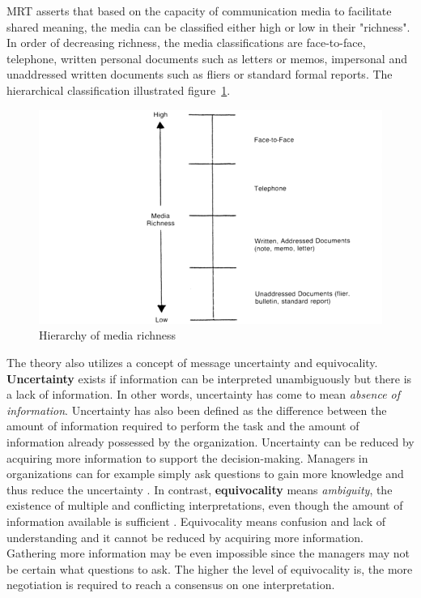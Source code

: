 \documentclass[english,12pt,a4paper,pdftex]{article}
\begin{document}
\ac{MRT} asserts that based on the capacity of communication media to facilitate shared meaning, the media can be classified either high or low in their "richness". In order of decreasing richness, the media classifications are face-to-face, telephone, written personal documents such as letters or memos, impersonal and unaddressed written documents such as fliers or standard formal reports. The hierarchical classification illustrated figure~\ref{fig:hierarchy_of_media_richness}.

\begin{figure}[htb]
\begin{center}
\includegraphics[width=1.0\textwidth]{hierarchy_of_media_richness.png}
\end{center}
\caption{Hierarchy of media richness \citep{daft1987}}
\label{fig:hierarchy_of_media_richness}
\end{figure}

The theory also utilizes a concept of message uncertainty and equivocality. \textbf{Uncertainty} exists if information can be interpreted unambiguously but there is a lack of information. In other words, uncertainty has come to mean \textit{absence of information}. Uncertainty has also been defined as the difference between the amount of information required to perform the task and the amount of information already possessed by the organization. Uncertainty can be reduced by acquiring more information to support the decision-making. Managers in organizations can for example simply ask questions to gain more knowledge and thus reduce the uncertainty \citep{daft1987}. In contrast, \textbf{equivocality} means \textit{ambiguity}, the existence of multiple and conflicting interpretations, even though the amount of information available is sufficient \citep{daft1987}. Equivocality means confusion and lack of understanding and it cannot be reduced by acquiring more information. Gathering more information may be even impossible since the managers may not be certain what questions to ask. The higher the level of equivocality is, the more negotiation is required to reach a consensus on one interpretation.
\end{document}
